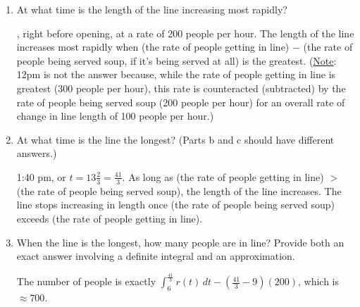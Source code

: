 \documentclass{article}
\begin{document}
\begin{enumerate}
\begin{enumerate}
  \item
    \begin{problem}
At what time is the length of the line increasing most
      rapidly? 
    \end{problem}
\vfill
    \begin{solution}
      , right before opening, at a rate of 200 people per hour. The length of the line increases most rapidly when (the rate of people getting in line) $-$ (the rate of people being served soup, if it's being served at all) is the greatest. (\underline{Note}: 12pm is not the answer because, while the rate of people getting in line is greatest (300 people per hour), this rate is counteracted (subtracted) by the rate of people being served soup (200 people per hour) for an overall rate of change in line length of 100 people per hour.) 
    \end{solution}

  \item
    \begin{problem}
      At what time is the line the longest? (Parts b and c should have different answers.)
    \end{problem}
\vfill
    \begin{solution}
    1:40 pm, or $t=13 \frac{2}{3} = \frac{41}{3}$. As long as (the rate of people getting in line) $>$ (the rate of people being served soup), the length of the line increases. The line stops increasing in length once (the rate of people being served soup) exceeds (the rate of people getting in line). 
    \end{solution}

  \item
    \begin{problem}
      When the line is the longest, how many people are in
      line? Provide both an  exact answer involving a definite integral and an approximation.
    \end{problem}
\vfill
    \begin{solution}
      The number of people is exactly
      $\displaystyle \int_6^{\frac{41}{3}} r(t)\,dt - \left(\frac{41}{3} - 9\right)(200)$, which is
      $\approx 700$.
    \end{solution}


\end{enumerate}
\end{enumerate}
\end{document}
